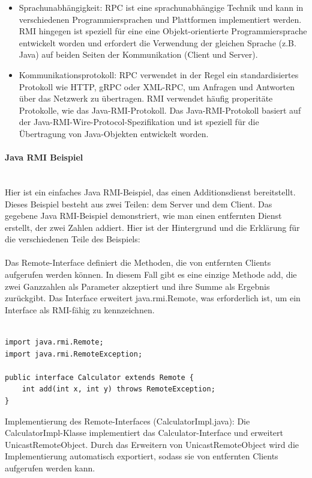 \documentclass[../vs-script-first-v01.tex]{subfiles}
\begin{document}
\begin{itemize} 
\item Sprachunabhängigkeit: RPC ist eine sprachunabhängige Technik und kann in verschiedenen Programmiersprachen und Plattformen implementiert werden. RMI hingegen ist speziell für eine eine Objekt-orientierte Programmiersprache entwickelt worden und erfordert die Verwendung der gleichen Sprache (z.B. Java) auf beiden Seiten der Kommunikation (Client und Server).
\item Kommunikationsprotokoll: RPC verwendet in der Regel ein standardisiertes Protokoll wie HTTP, gRPC oder XML-RPC, um Anfragen und Antworten über das Netzwerk zu übertragen. RMI verwendet häufig properitäte Protokolle, wie das Java-RMI-Protokoll. Das Java-RMI-Protokoll basiert auf der Java-RMI-Wire-Protocol-Spezifikation  und ist speziell für die Übertragung von Java-Objekten entwickelt worden.
\end{itemize} 

\paragraph{Java RMI Beispiel}\mbox{}\\
Hier ist ein einfaches Java RMI-Beispiel, das einen Additionsdienst bereitstellt. Dieses Beispiel besteht aus zwei Teilen: dem Server und dem Client. Das gegebene Java RMI-Beispiel demonstriert, wie man einen  entfernten Dienst erstellt, der zwei Zahlen addiert. Hier ist der Hintergrund und die Erklärung für die verschiedenen Teile des Beispiels:
\\\\
Das Remote-Interface definiert die Methoden, die von entfernten Clients aufgerufen werden können. In diesem Fall gibt es eine einzige Methode add, die zwei Ganzzahlen als Parameter akzeptiert und ihre Summe als Ergebnis zurückgibt. Das Interface erweitert java.rmi.Remote, was erforderlich ist, um ein Interface als RMI-fähig zu kennzeichnen.\\\\

\noindent\begin{minipage}{\textwidth}
\begin{lstlisting}[caption={Remote-Interface (Calculator.java)},captionpos=b,label={lst:rmi-serverI}]
import java.rmi.Remote;
import java.rmi.RemoteException;

public interface Calculator extends Remote {
    int add(int x, int y) throws RemoteException;
}
\end{lstlisting}
\end{minipage}
Implementierung des Remote-Interfaces (CalculatorImpl.java):
Die CalculatorImpl-Klasse implementiert das Calculator-Interface und erweitert UnicastRemoteObject. Durch das Erweitern von UnicastRemoteObject wird die Implementierung automatisch exportiert, sodass sie von entfernten Clients aufgerufen werden kann.\\\\
\end{document}
